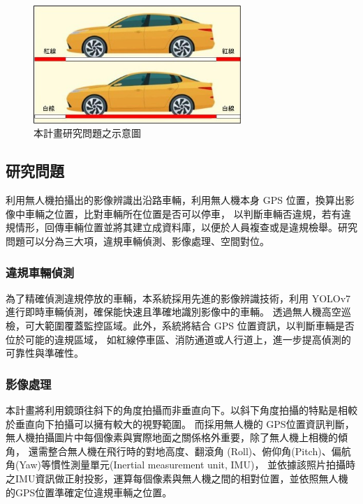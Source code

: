 \documentclass[12pt]{article}       %
\renewcommand{\figurename}{圖}                           %
\begin{document}
\begin{figure}[htbp]
    \centering
    \renewcommand{\figurename}{圖} %
    \includegraphics[width=0.7\textwidth]{research_problem2.jpg}     %
    \caption{本計畫研究問題之示意圖}    %
    \label{fig:research_problem2}    %
\end{figure}

\subsection{研究問題} 
\hspace{2em}利用無人機拍攝出的影像辨識出沿路車輛，利用無人機本身 GPS 位置，換算出影像中車輛之位置，比對車輛所在位置是否可以停車，
以判斷車輛否違規，若有違規情形，回傳車輛位置並將其建立成資料庫，以便於人員複查或是違規檢舉。研究問題可以分為三大項，違規車輛偵測、影像處理、空間對位。

\subsubsection{違規車輛偵測}
\hspace{2em}為了精確偵測違規停放的車輛，本系統採用先進的影像辨識技術，利用 YOLOv7 進行即時車輛偵測，確保能快速且準確地識別影像中的車輛。
透過無人機高空巡檢，可大範圍覆蓋監控區域。此外，系統將結合 GPS 位置資訊，以判斷車輛是否位於可能的違規區域，
如紅線停車區、消防通道或人行道上，進一步提高偵測的可靠性與準確性。

\subsubsection{影像處理}
\hspace{2em}本計畫將利用鏡頭往斜下的角度拍攝而非垂直向下。以斜下角度拍攝的特點是相較於垂直向下拍攝可以擁有較大的視野範圍。
而採用無人機的 GPS位置資訊判斷，無人機拍攝圖片中每個像素與實際地面之關係格外重要，除了無人機上相機的傾角，
還需整合無人機在飛行時的對地高度、翻滾角 (Roll)、俯仰角(Pitch)、偏航角(Yaw)等慣性測量單元(Inertial measurement unit, IMU)，
並依據該照片拍攝時之IMU資訊做正射投影，運算每個像素與無人機之間的相對位置，並依照無人機的GPS位置準確定位違規車輛之位置。
\end{document}
